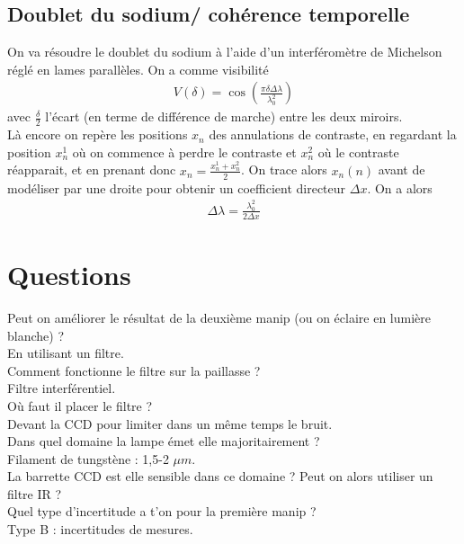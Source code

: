 \documentclass[12pt,prb,aps,epsf]{report}
\begin{document}
\subsection{Doublet du sodium/ cohérence temporelle}
On va résoudre le doublet du sodium à l'aide d'un interféromètre de Michelson réglé en lames parallèles. On a comme visibilité
\begin{eqnarray}
V(\delta) = \cos\left(\frac{\pi\delta \Delta\lambda}{\lambda_0^2}\right)
\end{eqnarray}
avec $\frac{\delta}{2}$ l'écart (en terme de différence de marche) entre les deux miroirs.\\
Là encore on repère les positions $x_n$ des annulations de contraste, en regardant la position $x_n^1$  où on commence à perdre le contraste et $x_n^2$ où le contraste réapparait, et en prenant donc $x_n = \frac{x_n^1+x_n^2}{2}$. On trace alors $x_n(n)$ avant de modéliser par une droite pour obtenir un coefficient directeur $\Delta x$. On a alors 
\begin{eqnarray}
\Delta \lambda = \frac{\lambda_0^2}{2\Delta x}
\end{eqnarray}

\section*{Questions}
Peut on améliorer le résultat de la deuxième manip (ou on éclaire en lumière blanche) ?\\
En utilisant un filtre.\\

Comment fonctionne le filtre sur la paillasse ?\\
Filtre interférentiel.\\

Où faut il placer le filtre ?\\
Devant la CCD pour limiter dans un même temps le bruit.\\

Dans quel domaine la lampe émet elle majoritairement ?\\
Filament de tungstène : 1,5-2 $\mu m$.\\

La barrette CCD est elle sensible dans ce domaine ? Peut on alors utiliser un filtre IR ?\\

Quel type d'incertitude a t'on pour la première manip ?\\
Type B : incertitudes de mesures. \\
\end{document}
